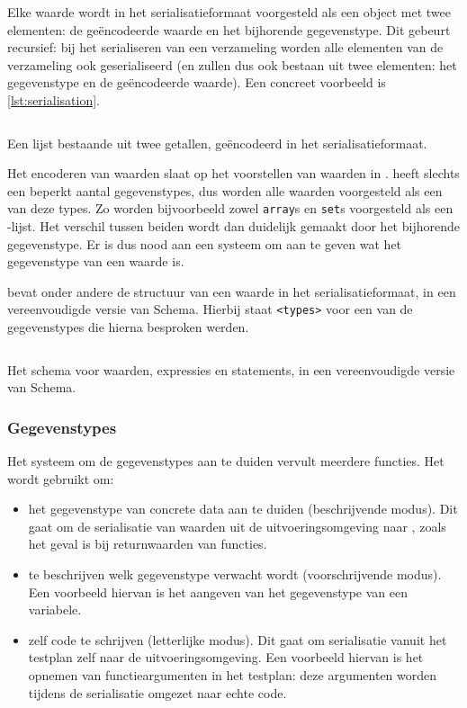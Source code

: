 Elke waarde wordt in het serialisatieformaat voorgesteld als een object met twee elementen: de geëncodeerde waarde en het bijhorende gegevenstype.
Dit gebeurt recursief: bij het serialiseren van een verzameling worden alle elementen van de verzameling ook geserialiseerd (en zullen dus ook bestaan uit twee elementen: het gegevenstype en de geëncodeerde waarde).
Een concreet voorbeeld is \cref{lst:serialisation}.

\begin{listing}
    \inputminted{json}{code/testplan-value-list.json}
    \caption{Een lijst bestaande uit twee getallen, geëncodeerd in het serialisatieformaat.}
    \label{lst:serialisation}
\end{listing}

Het encoderen van waarden slaat op het voorstellen van waarden in .
 heeft slechts een beperkt aantal gegevenstypes, dus worden alle waarden voorgesteld als een van deze types.
Zo worden bijvoorbeeld zowel \texttt{array}s en \texttt{set}s voorgesteld als een -lijst.
Het verschil tussen beiden wordt dan duidelijk gemaakt door het bijhorende gegevenstype.
Er is dus nood aan een systeem om aan te geven wat het gegevenstype van een waarde is.

 bevat onder andere de structuur van een waarde in het serialisatieformaat, in een vereenvoudigde versie van  Schema.
Hierbij staat \texttt{<types>} voor een van de gegevenstypes die hierna besproken werden.

\begin{listing}
    \inputminted{json}{code/type-schema.json}
    \caption{Het schema voor waarden, expressies en statements, in een vereenvoudigde versie van  Schema.}
    \label{lst:type-schema}
\end{listing}

\clearpage

\subsubsection{Gegevenstypes}

Het systeem om de gegevenstypes aan te duiden vervult meerdere functies.
Het wordt gebruikt om:

\begin{itemize}
    \item het gegevenstype van concrete data aan te duiden (beschrijvende modus).
    Dit gaat om de serialisatie van waarden uit de uitvoeringsomgeving naar \tested{}, zoals het geval is bij returnwaarden van functies.
    \item te beschrijven welk gegevenstype verwacht wordt (voorschrijvende modus).
    Een voorbeeld hiervan is het aangeven van het gegevenstype van een variabele.
    \item zelf code te schrijven (letterlijke modus).
    Dit gaat om serialisatie vanuit het testplan zelf naar de uitvoeringsomgeving.
    Een voorbeeld hiervan is het opnemen van functieargumenten in het testplan: deze argumenten worden tijdens de serialisatie omgezet naar echte code.
\end{itemize}

